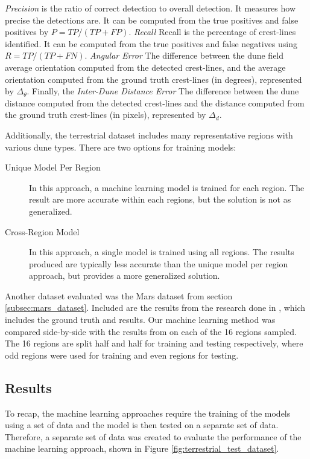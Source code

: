\emph{Precision} is the ratio of correct detection to overall detection. It measures how precise the detections are. It can be computed from the true positives and false positives by $P=TP/(TP+FP)$. \emph{Recall} Recall is the percentage of crest-lines identified. It can be computed from the true positives and false negatives using $R=TP/(TP+FN)$. \emph{Angular Error} The difference between the dune field average orientation computed from the detected crest-lines, and the average orientation computed from the ground truth crest-lines (in degrees), represented by $\Delta_{\theta}$. Finally, the \emph{Inter-Dune Distance Error} The difference between the dune distance computed from the detected crest-lines and the distance computed from the ground truth crest-lines (in pixels), represented by $\Delta_{d}$.

Additionally, the terrestrial dataset includes many representative regions with various dune types. There are two options for training models:
\begin{description}
	\item[Unique Model Per Region] In this approach, a machine learning model is trained for each region. The result are more accurate within each regions, but the solution is not as generalized. 
	\item[Cross-Region Model] In this approach, a single model is trained using all regions. The results produced are typically less accurate than the unique model per region approach, but provides a more generalized solution.
\end{description}

Another dataset evaluated was the Mars dataset from section \ref{subsec:mars_dataset}. Included are the results from the research done in \cite{vaz_object_based_dune_analysis}, which includes the ground truth and results. Our machine learning method was compared side-by-side with the results from \cite{vaz_object_based_dune_analysis} on each of the 16 regions sampled. The 16 regions are split half and half for training and testing respectively, where odd regions were used for training and even regions for testing. 

\subsection{Results} \label{subsec:results-and-discussion}
To recap, the machine learning approaches require the training of the models using a set of data and the model is then tested on a separate set of data. Therefore, a separate set of data was created to evaluate the performance of the machine learning approach, shown in Figure \ref{fig:terrestrial_test_dataset}.

